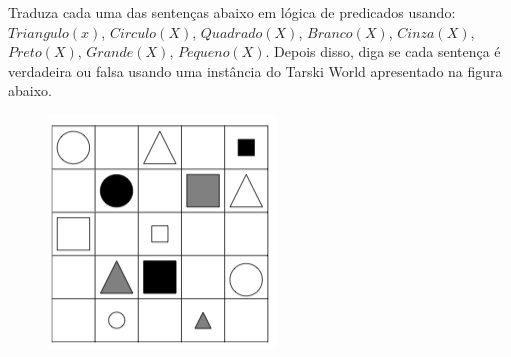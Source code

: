 
\question[10]

Traduza cada uma das sentenças abaixo em lógica de predicados usando: $Triangulo(x)$, $Circulo(X)$, $Quadrado(X)$, $Branco(X)$, $Cinza(X)$, $Preto(X)$, $Grande(X)$, $Pequeno(X)$. Depois disso, diga se cada sentença é verdadeira ou falsa usando uma instância do Tarski World apresentado na figura abaixo.

\begin{figure}[h!]
	\centering
	\includegraphics[width=0.3\linewidth]{10-logica-de-predicados-semantica/images/tarski-world}
\end{figure}


	